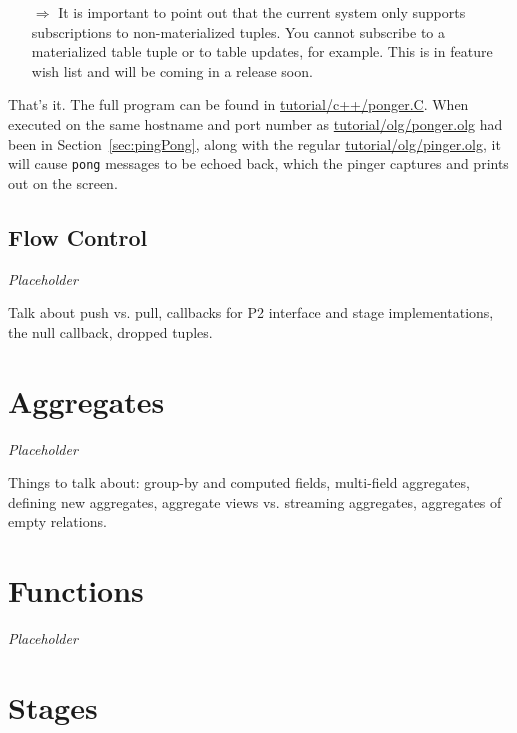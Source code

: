 \documentclass{article}
\begin{document}
\begin{itemize}
\item[$\Longrightarrow$] It is important to point out that the current
  system only supports subscriptions to non-materialized tuples. You
  cannot subscribe to a materialized table tuple or to table updates,
  for example.  This is in feature wish list and will be coming in a
  release soon.
\end{itemize}


That's it. The full program can be found in
\url{tutorial/c++/ponger.C}. When executed on the same hostname and port
number as \url{tutorial/olg/ponger.olg} had been in
Section~\ref{sec:pingPong}, along with the regular
\url{tutorial/olg/pinger.olg}, it will cause \lstinline$pong$ messages
to be echoed back, which the pinger captures and prints out on the
screen.




\subsection{Flow Control}

\emph{Placeholder}

Talk about push vs. pull, callbacks for P2 interface and stage
implementations, the null callback, dropped tuples.













\section{Aggregates}
\label{sec:aggregates}

\emph{Placeholder}

Things to talk about: group-by and computed fields, multi-field
aggregates, defining new aggregates, aggregate views vs. streaming
aggregates, aggregates of empty relations.



\section{Functions}
\label{sec:functions}

\emph{Placeholder}


\section{Stages}
\end{document}
